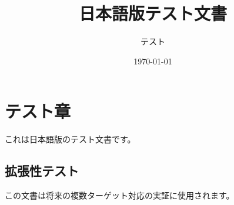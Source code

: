 \documentclass[12pt,a4paper]{ltjsbook}
\title{日本語版テスト文書}
\author{テスト}
\date{\today}
\begin{document}
\maketitle

\chapter{テスト章}

これは日本語版のテスト文書です。

\section{拡張性テスト}

この文書は将来の複数ターゲット対応の実証に使用されます。





\end{document}
